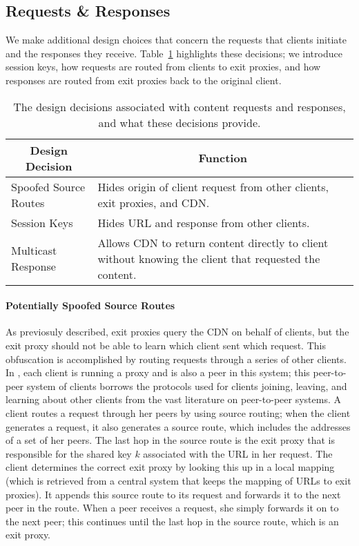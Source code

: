 \subsection{Requests \& Responses}
We make additional design choices that concern the requests that clients initiate
and
the responses they receive.  Table~\ref{tab:request_response} highlights these decisions;
we 
introduce session keys, how requests are routed from clients to exit proxies, and how responses 
are routed from exit proxies back to the original client.

\begin{table}[t!]
\footnotesize
\centering
\begin{tabular}{ l  p{1.8in} } 
 \multicolumn{1}{c}{\bf Design Decision} & \multicolumn{1}{c}{\bf Function} \\
\hline \hline
Spoofed Source Routes & {Hides origin of client request from other
 clients, exit proxies, and CDN.} \\
 Session Keys & {Hides URL and response from other clients.} \\
 Multicast Response & {Allows CDN to return content directly to client without knowing
 the client that requested the content.} \\
 \hline
\end{tabular}
\caption{The design decisions associated with content requests and responses, and what these 
decisions provide.}
\label{tab:request_response}
\end{table}

\paragraph{Potentially Spoofed Source Routes}
As previosuly described, exit proxies query the CDN on behalf of clients, but the
exit proxy
should not be able to learn which client sent which request.  This obfuscation is
accomplished by routing requests through
a series of other clients.  In \system{}, each client is running a proxy and is
also a peer in this system; this 
peer-to-peer system of clients borrows the 
protocols used for clients joining, leaving, and learning about other clients from
the vast literature on peer-to-peer systems. A client routes a request through
her peers by using source routing; when the client generates a request, it also
generates a source route, which includes
the addresses of a set of her peers.  The last hop in the source route is the exit proxy that is responsible for the 
shared key $k$ associated with the URL in her request.  The client determines the correct exit proxy by looking this 
up in a local mapping (which is retrieved from a central system that keeps the mapping of URLs to exit proxies).  
It appends this source route to its request and forwards it to the next peer
in the route.  When a peer receives
a request, she simply forwards it on to the next peer; this continues until the last hop in the source route, which 
is an exit proxy. 

